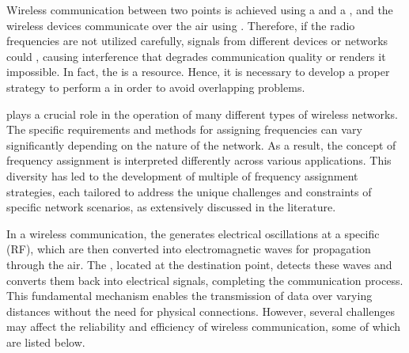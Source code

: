 \documentclass[a4paper, 12pt]{report}
\begin{document}
    Wireless communication between two points is achieved using a  and a , and the wireless devices communicate over the air using . Therefore, if the radio frequencies are not utilized carefully, signals from different devices or networks could , causing interference that degrades communication quality or renders it impossible. In fact, the  is a  resource. Hence, it is necessary to develop a proper strategy to perform a  in order to avoid overlapping problems.

     plays a crucial role in the operation of many different types of wireless networks. The specific requirements and methods for assigning frequencies can vary significantly depending on the nature of the network. As a result, the concept of frequency assignment is interpreted differently across various applications. This diversity has led to the development of multiple  of frequency assignment strategies, each tailored to address the unique challenges and constraints of specific network scenarios, as extensively discussed in the literature.

    In a wireless communication, the  generates electrical oscillations at a specific  (RF), which are then converted into electromagnetic waves for propagation through the air. The , located at the destination point, detects these waves and converts them back into electrical signals, completing the communication process. This fundamental mechanism enables the transmission of data over varying distances without the need for physical connections. However, several challenges may affect the reliability and efficiency of wireless communication, some of which are listed below.
\end{document}
